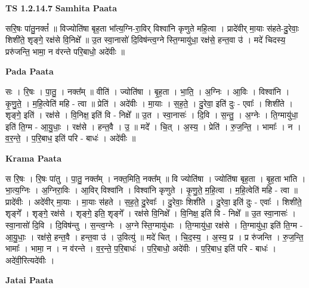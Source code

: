\documentclass[17pt]{extarticle}
\begin{document}
\textbf{TS 1.2.14.7 } \newline
\textbf{Samhita Paata} \newline

सरि॒षः पा॑तु॒नक्तं᳚ ॥ विज्योति॑षा बृह॒ता भा᳚त्य॒ग्नि-रा॒विर् विश्वा॑नि कृणुते महि॒त्वा । प्रादे॑वीर् मा॒याः स॑हते-दु॒रेवाः॒ शिशी॑ते॒ शृङ्गे॒ रक्ष॑से वि॒निक्षे᳚ ॥ उ॒त स्वा॒नासो॑ दि॒विष॑न्त्व॒ग्ने स्ति॒ग्मायु॑धा॒ रक्ष॑से॒ हन्त॒वा उ॑ । मदे॑ चिदस्य॒ प्ररु॑जन्ति॒ भामा॒ न व॑रन्ते परि॒बाधो॒ अदे॑वीः ॥ \newline

\textbf{Pada Paata} \newline

सः । रि॒षः । पा॒तु॒ । नक्त᳚म् ॥ वीति॑ । ज्योति॑षा । बृ॒ह॒ता । भा॒ति॒ । अ॒ग्निः । आ॒विः । विश्वा॑नि । कृ॒णु॒ते॒ । म॒हि॒त्वेति॑ महि - त्वा ॥ प्रेति॑ । अदे॑वीः । मा॒याः । स॒ह॒ते॒ । दु॒रेवा॒ इति॑ दुः - एवाः᳚ । शिशी॑ते । शृङ्गे॒ इति॑ । रक्ष॑से । वि॒निक्ष॒ इति॑ वि - निक्षे᳚ ॥ उ॒त । स्वा॒नासः॑ । दि॒वि । स॒न्तु॒ । अ॒ग्नेः । ति॒ग्मायु॑धा॒ इति॑ ति॒ग्म - आ॒यु॒धाः॒ । रक्ष॑से । हन्त॒वै । उ॒ ॥ मदे᳚ । चि॒त् । अ॒स्य॒ । प्रेति॑ । रु॒ज॒न्ति॒ । भामाः᳚ । न । व॒र॒न्ते॒ । प॒रि॒बाध॒ इति॑ परि - बाधः॑ । अदे॑वीः ॥  \newline


\textbf{Krama Paata} \newline

स रि॒षः । रि॒षः पा॑तु । पा॒तु॒ नक्त᳚म् । नक्त॒मिति॒ नक्त᳚म् ॥ वि ज्योति॑षा । ज्योति॑षा बृह॒ता । बृ॒ह॒ता भा॑ति । भा॒त्य॒ग्निः । अ॒ग्निरा॒विः । आ॒विर् विश्वा॑नि । विश्वा॑नि कृणुते । कृ॒णु॒ते॒ म॒हि॒त्वा । म॒हि॒त्वेति॑ महि - त्वा ॥ प्रादे॑वीः । अदे॑वीर् मा॒याः । मा॒याः स॑हते । स॒ह॒ते॒ दु॒रेवाः᳚ । दु॒रेवाः॒ शिशी॑ते । दु॒रेवा॒ इति॑ दुः - एवाः᳚ । शिशी॑ते॒ शृङ्गे᳚ । शृङ्गे॒ रक्ष॑से । शृङ्गे॒ इति॒ शृङ्गे᳚ । रक्ष॑से वि॒निक्षे᳚ । वि॒निक्ष॒ इति॑ वि - निक्षे᳚ ॥ उ॒त स्वा॒नासः॑ । स्वा॒नासो॑ दि॒वि । दि॒विष॑न्तु । स॒न्त्व॒ग्नेः । अ॒ग्ने स्ति॒ग्मायु॑धाः । ति॒ग्मायु॑धा॒ रक्ष॑से । ति॒ग्मायु॑धा॒ इति॑ ति॒ग्म - आ॒यु॒धाः॒ । रक्ष॑से॒ हन्त॒वै । हन्त॒वा उ॑ । उ॒वित्यु॑ ॥ मदे॑ चित् । चि॒द॒स्य॒ । अ॒स्य॒ प्र । प्र रु॑जन्ति । रु॒ज॒न्ति॒ भामाः᳚ । भामा॒ न । न व॑रन्ते । व॒र॒न्ते॒ प॒रि॒बाधः॑ । प॒रि॒बाधो॒ अदे॑वीः । प॒रि॒बाध॒ इति॑ परि - बाधः॑ । अदे॑वी॒रित्यदे॑वीः । \newline

\textbf{Jatai Paata} \newline
\end{document}
